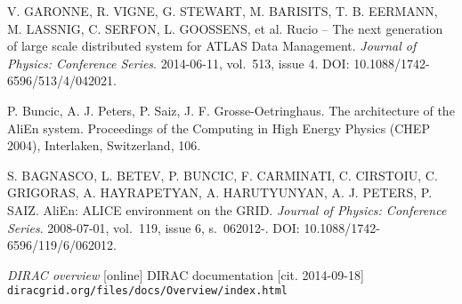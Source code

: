 \begin{thebibliography}{99}
	V. GARONNE, R. VIGNE, G. STEWART, M. BARISITS, T. B. EERMANN, M. LASSNIG, C. SERFON, L. GOOSSENS, et al. 
	Rucio – The next generation of large scale distributed system for ATLAS Data Management. 
	\textit{Journal of Physics: Conference Series}. 2014-06-11, vol.~513, issue 4.
	DOI: 10.1088/1742-6596/513/4/042021.
	
	P. Buncic, A. J. Peters, P. Saiz, J. F. Grosse-Oetringhaus. 
	The architecture of the AliEn system. Proceedings of the Computing in High Energy Physics (CHEP 2004), 				
	Interlaken, Switzerland, 106.
	
	S. BAGNASCO, L. BETEV, P. BUNCIC, F. CARMINATI, C. CIRSTOIU, C. GRIGORAS, A. HAYRAPETYAN, A. HARUTYUNYAN, 
	A. J. PETERS, P. SAIZ. 
	AliEn: ALICE environment on the GRID. 
	\textit{Journal of Physics: Conference Series}. 2008-07-01, vol.~119, issue 6, s.~062012-. 
	DOI: 10.1088/1742-6596/119/6/062012.

	\emph{DIRAC overview} [online] 
	DIRAC documentation [cit. 2014-09-18]
	\texttt{diracgrid.org/files/docs/Overview/index.html}
	

		

\end{thebibliography}
